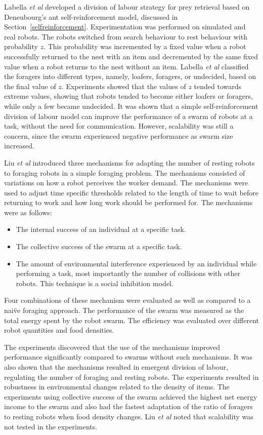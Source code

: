 \documentclass[preprint,12pt]{elsarticle}
\begin{document}
Labella \textit{et al} \cite{labella2006division} developed a division of labour strategy for prey retrieval based on Deneubourg's ant self-reinforcement model, discussed in Section~\ref{selfreinforcement}. Experimentation was performed on simulated and real robots. The robots switched from search behaviour to rest behaviour with probability $z$. This probability was incremented by a fixed value when a robot successfully returned to the nest with an item and decremented by the same fixed value when a robot returns to the nest without an item. Labella \textit{et al} classified the foragers into different types, namely, loafers, foragers, or undecided, based on the final value of $z$. Experiments showed that the values of $z$ tended towards extreme values, showing that robots tended to become either loafers or foragers, while only a few became undecided. It was shown that a simple self-reinforcement division of labour model can improve the performance of a swarm of robots at a task, without the need for communication. However, scalability was still a concern, since the swarm experienced negative performance as swarm size increased. 

Liu \textit{et al} \cite{liu2007towards} introduced three mechanisms for adapting the number of resting robots to foraging robots in a simple foraging problem. The mechanisms consisted of variations on how a robot perceives the worker demand. The mechanisms were used to adjust time specific thresholds related to the length of time to wait before returning to work and how long work should be performed for. The mechanisms were as follows:

\begin{itemize}
	\item The internal success of an individual at a specific task.
	\item The collective success of the swarm at a specific task. 
	\item The amount of environmental interference experienced by an individual while performing a task, most importantly the number of collisions with other robots. This technique is a social inhibition model.
\end{itemize}

Four combinations of these mechanism were evaluated as well as compared to a nai\"ve foraging approach. The performance of the swarm was measured as the total energy spent by the robot swarm. The efficiency was evaluated over different robot quantities and food densities.

The experiments discovered that the use of the mechanisms improved performance significantly compared to swarms without such mechanisms. It was also shown that the mechanisms resulted in emergent division of labour, regulating the number of foraging and resting robots. The experiments resulted in robustness in environmental changes related to the density of items. The experiments using collective success of the swarm achieved the highest net energy income to the swarm and also had the fastest adaptation of the ratio of foragers to resting robots when food density changes. Liu \textit{et al} \cite{liu2007towards} noted that scalability was not tested in the experiments.
\end{document}
